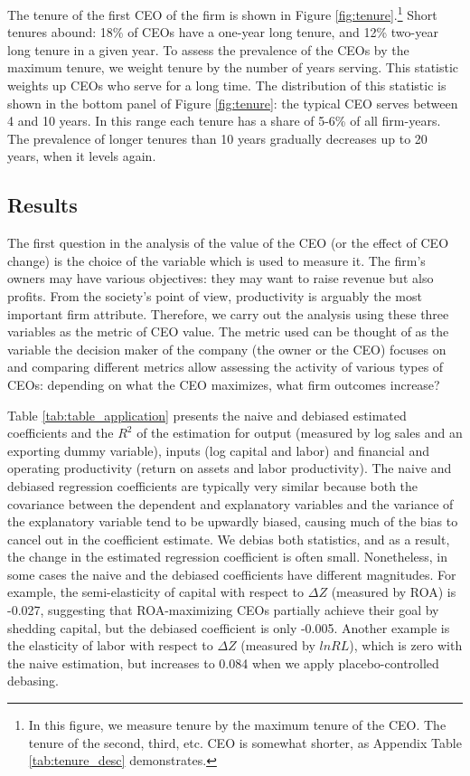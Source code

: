 \documentclass[11pt,a4paper]{article}
\begin{document}
The tenure of the first CEO of the firm is shown in Figure \ref{fig:tenure}.\footnote{In this figure, we measure tenure by the maximum tenure of the CEO. The tenure of the second, third, etc. CEO is somewhat shorter, as Appendix Table \ref{tab:tenure_desc} demonstrates.} Short tenures abound: 18\% of CEOs have a one-year long tenure, and 12\% two-year long tenure in a given year. To assess the prevalence of the CEOs by the maximum tenure, we weight tenure by the number of years serving. This statistic weights up CEOs who serve for a long time. The  distribution of this statistic is shown in the bottom panel of Figure \ref{fig:tenure}: the typical CEO serves between 4 and 10 years. In this range each tenure has a share of 5-6\% of all firm-years. The prevalence of longer tenures than 10 years gradually decreases up to 20 years, when it levels again. 


\subsection{Results}

The first question in the analysis of the value of the CEO (or the effect of CEO change) is the choice of the variable which is used to measure it. The firm's owners may have various objectives: they may want to raise revenue but also profits. From the society's point of view, productivity is arguably the most important firm attribute. Therefore, we carry out the analysis using these three variables as the metric of CEO value. The metric used can be thought of as the variable the decision maker of the company (the owner or the CEO) focuses on and comparing different metrics allow assessing the activity of various types of CEOs: depending on what the CEO maximizes, what firm outcomes increase?

Table \ref{tab:table_application} presents the naive and debiased estimated coefficients and the $R^2$ of the estimation for output (measured by log sales and an exporting dummy variable), inputs (log capital and labor) and financial and operating productivity (return on assets and labor productivity). The naive and debiased regression coefficients are typically very similar because both the covariance between the dependent and explanatory variables and the variance of the explanatory variable tend to be upwardly biased, causing much of the bias to cancel out in the coefficient estimate. We debias both statistics, and as a result, the change in the estimated regression coefficient is often small. Nonetheless, in some cases the naive and the debiased coefficients have different magnitudes. For example, the semi-elasticity of capital with respect to $\Delta Z$ (measured by ROA) is -0.027, suggesting that ROA-maximizing CEOs partially achieve their goal by shedding capital, but the debiased coefficient is only -0.005. Another example is the elasticity of labor with respect to $\Delta Z$ (measured by $lnRL$), which is zero with the naive estimation, but increases to 0.084 when we apply placebo-controlled debasing.
\end{document}
